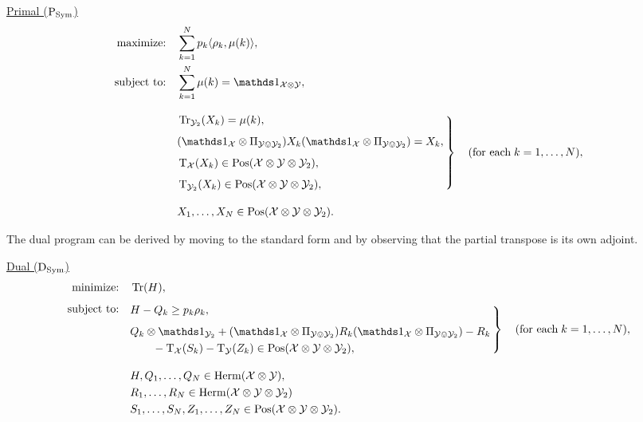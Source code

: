 \begin{center}
\underline{Primal ($\textup{P}_{\mathrm{Sym}}$)}
\begin{equation}
  \label{eq:sym-primal-problem}
  \begin{split}
    \text{maximize:} \quad & 
      \sum_{k=1}^{N} p_{k}\ip{\rho_{k}}{\mu(k)},\\
    \text{subject to:} \quad & 
      \sum_{k=1}^{N} \mu(k) = \I_{\X\otimes\Y},\\[2ex]
        & \left.\kern-\nulldelimiterspace
        \!\!\begin{aligned}
          &\tr_{\Y_{2}}(X_{k}) = \mu(k),\\[1ex]
          &(\I_{\X}\otimes \Pi_{\Y\ovee\Y_{2}})X_{k}
                  (\I_{\X}\otimes \Pi_{\Y\ovee\Y_{2}}) = X_{k},\\[1ex]
          &\pt_{\X}(X_{k}) \in \Pos(\X\otimes\Y\otimes\Y_{2}),\\[1ex]
          &\pt_{\Y_{2}}(X_{k}) \in \Pos(\X\otimes\Y\otimes\Y_{2}),
      \end{aligned}\,\right\} \quad(\text{for each}\;k = 1,\ldots,N),\\[2ex]
      \quad & X_{1}, \ldots, X_{N} \in \Pos(\X\otimes\Y\otimes\Y_{2}).
  \end{split}
\end{equation}
\end{center}
\vspace{10pt} 
The dual program can be derived by moving to the standard form and 
by observing that the partial transpose is its own adjoint.
\vspace{10pt} 
\begin{center}
\underline{Dual ($\textup{D}_{\mathrm{Sym}}$)}
\begin{equation}
  \label{eq:sym-dual-problem}
  \begin{split}
    \text{minimize:} \quad &
      \tr(H),\\[1ex]
    \text{subject to:} 
      \quad \\[-3.5ex] 
      & \left.\kern-\nulldelimiterspace
        \!\!\begin{aligned}
          &H - Q_{k} \geq p_{k}\rho_{k},\\[1ex]
          & Q_{k}\otimes\I_{\Y_{2}} + (\I_{\X}\otimes \Pi_{\Y\ovee\Y_{2}})R_{k}(\I_{\X}\otimes \Pi_{\Y\ovee\Y_{2}}) - R_{k} \\ 
            & \qquad - \pt_{\X}(S_{k}) - \pt_{\Y}(Z_{k})
      \in \Pos(\X\otimes\Y\otimes\Y_{2}),
      \end{aligned}\,\right\} \quad(\text{for each}\;k = 1,\ldots,N),\\[2ex]
      \quad & H, Q_{1}, \ldots, Q_{N}\in\Herm(\X\otimes\Y),\\
      \quad & R_{1}, \ldots, R_{N}\in\Herm(\X\otimes\Y\otimes\Y_{2})\\
      \quad & S_{1}, \ldots, S_{N},Z_{1},\ldots,Z_{N}
        \in\Pos(\X\otimes\Y\otimes\Y_{2}).\\
  \end{split}
\end{equation}
\end{center}

